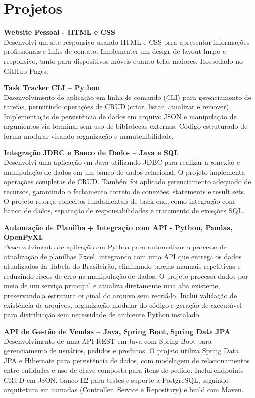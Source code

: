 \documentclass[a4paper,10pt]{article}
\begin{document}
\section{Projetos}
\textbf{Website Pessoal - HTML e CSS} \\
Desenvolvi um site responsivo usando HTML e CSS para apresentar informações profissionais e links de contato. Implementei um design de layout limpo e responsivo, tanto para dispositivos móveis quanto telas maiores. Hospedado no GitHub Pages.

\textbf{Task Tracker CLI – Python} \\
Desenvolvimento de aplicação em linha de comando (CLI) para gerenciamento de tarefas, permitindo operações de CRUD (criar, listar, atualizar e remover). Implementação de persistência de dados em arquivo JSON e manipulação de argumentos via terminal sem uso de bibliotecas externas. Código estruturado de forma modular visando organização e manutenibilidade.  

\textbf{Integração JDBC e Banco de Dados – Java e SQL} \\
Desenvolvi uma aplicação em Java utilizando JDBC para realizar a conexão e manipulação de dados em um banco de dados relacional. O projeto implementa operações completas de CRUD. Também foi aplicado gerenciamento adequado de recursos, garantindo o fechamento correto de conexões, statements e result sets. O projeto reforça conceitos fundamentais de back-end, como integração com banco de dados, separação de responsabilidades e tratamento de exceções SQL.

\textbf{Automação de Planilha + Integração com API - Python, Pandas, OpenPyXL} \\
Desenvolvimento de aplicação em Python para automatizar o processo de atualização de planilhas Excel, integrando com uma API que entrega os dados atualizados da Tabela do Brasileirão, eliminando tarefas manuais repetitivas e reduzindo riscos de erro na manipulação de dados. O projeto processa dados por meio de um serviço principal e atualiza diretamente uma aba existente, preservando a estrutura original do arquivo sem recriá-lo. Inclui validação de existência de arquivos, organização modular do código e geração de executável para distribuição sem necessidade de ambiente Python instalado.

\textbf{API de Gestão de Vendas – Java, Spring Boot, Spring Data JPA} \\
Desenvolvimento de uma API REST em Java com Spring Boot para gerenciamento de usuários, pedidos e produtos. O projeto utiliza Spring Data JPA e Hibernate para persistência de dados, com modelagem de relacionamentos entre entidades e uso de chave composta para itens de pedido. Inclui endpoints CRUD em JSON, banco H2 para testes e suporte a PostgreSQL, seguindo arquitetura em camadas (Controller, Service e Repository) e build com Maven.
\end{document}
